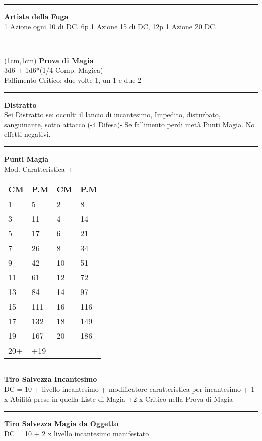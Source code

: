 \documentclass[a4paper,12 pt,openany]{book}
\newcommand{\riga}{\rule{\textwidth}{0.4pt}}
\begin{document}
\begin{textblock*}{7cm}
\riga

\textbf{Artista della Fuga}\\
1 Azione ogni 10 di DC. 6p 1 Azione 15 di DC, 12p 1 Azione 20 DC.

\end{textblock*}

~\newpage

\begin{textblock*}{5cm}(1cm,1cm) %
\textbf{Prova di Magia}\\
3d6 + 1d6*(1/4 Comp. Magica)\\
Fallimento Critico: due volte 1, un 1 e due 2\\

\riga

\textbf{Distratto}\\
Sei Distratto se: occulti il lancio di incantesimo, Impedito, disturbato, sanguinante, sotto attacco (-4 Difesa)-
Se fallimento perdi metà Punti Magia. No effetti negativi.\\

\riga

\textbf{Punti Magia}\\
Mod. Caratteristica + \\

\begin{tabular}{ll|ll}
\textbf{CM} & \textbf{P.M}&	\textbf{CM} & \textbf{P.M}\\
	1 &5 &2&8 \\
	3&11&4&14\\
	5&17&6&21\\
	7&26&8&34\\
	9&42&10&51\\
	11&61&12&72\\
	13&84&14&97\\
	15&111&16&116\\
	17&132&18&149\\
	19&167&20&186\\
	20+&+19&&\\
\end{tabular}

\riga

\textbf{Tiro Salvezza Incantesimo}\\
DC = 10 + livello incantesimo + modificatore caratteristica per incantesimo + 1 x Abilità prese in quella Liste di Magia +2 x Critico nella Prova di Magia

\riga

\textbf{Tiro Salvezza Magia da Oggetto}\\
DC = 10 + 2 x livello incantesimo manifestato


\end{textblock*}
\end{document}
